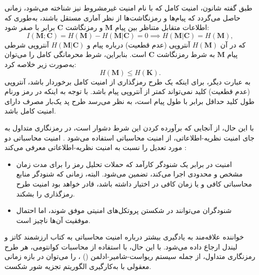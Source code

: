 طبق گفته شانون\cite{1-12}، امنیت کامل که با نام امنیت غیرمشروط نیز شناخته می‌شود، زمانی حاصل می‌گردد که پیام‌ها و رمزنگاشت‌ها از نظر آماری مستقل باشند، به‌طوری که اطلاعات متقابل متناظر بین پیام $\bm{M}$ و رمزنگاشت $\bm{C}$ برابر با صفر شود:
\begin{equation}
	I(\bm{M}; \bm{C}) = H(\bm{M}) - H(\bm{M}|\bm{C}) = 0 \implies H(\bm{M}|\bm{C}) = H(\bm{M}),
\end{equation}
که در آن $H(\bm{M})$ آنتروپی (عدم قطعیت) درباره پیام و $H(\bm{M}|\bm{C})$ آنتروپی شرطی پیام $\bm{M}$ به شرط رمزنگاشت $\bm{C}$ است. بنابراین، شرط محرمانگی کامل را می‌توان به‌صورت زیر خلاصه کرد:
\begin{equation}
	H(\bm{M}) \leq H(\bm{K}).
	\label{eq:1-2}
\end{equation}
به عبارت دیگر، برای اینکه یک طرح رمزگذاری از امنیت کامل برخوردار باشد، آنتروپی (عدم قطعیت) کلید نمی‌تواند کمتر از آنتروپی پیام باشد. با توجه به اینکه در رمز ورنام طول کلید حداقل برابر با طول پیام است، به نظر می‌رسد طرح پد یک‌بار مصرف دارای امنیت کامل باشد.

با این حال، از آنجایی که برآورده کردن این شرط دشوار است، در رمزنگاری متداول به جای امنیت نظریه-اطلاعاتی، از امنیت محاسباتی استفاده می‌شود \cite{1-10, 1-13, 1-16, 1-22, 1-23, 1-24, 1-25}. امنیت محاسباتی دو مورد تعدیل را نسبت به امنیت نظریه-اطلاعاتی معرفی می‌کند \cite{1-16}:
\begin{itemize}
	\item امنیت در برابر یک شنودگر کارآمد که حملات تحلیل رمز را برای مدت زمان مشخص و محدودی اجرا می‌کند، تضمین می‌شود. البته، زمانی که شنودگر منابع محاسباتی کافی و یا زمان کافی در اختیار داشته باشد، قادر خواهد بود امنیت طرح رمزگذاری را بشکند.
	\item شنودگران می‌توانند در شکستن پروتکل‌های امنیتی موفق شوند، اما احتمال موفقیت آن‌ها ناچیز است.
\end{itemize}
خواننده علاقه‌مند به یادگیری بیشتر درباره امنیت محاسباتی به کتاب ارزشمند کاتز و لیندل \cite{1-16} ارجاع داده می‌شود. با این حال، با استفاده از محاسبات کوانتومی، هر طرح رمزنگاری متداول، از جمله سیستم ریواست-شامیر-ادلمن () \cite{1-26}، را می‌توان در بازه زمانی معقولی با به‌کارگیری الگوریتم تجزیه شور \cite{1-9, 1-10, 1-11, 1-27, 1-28, 1-29} شکست.

